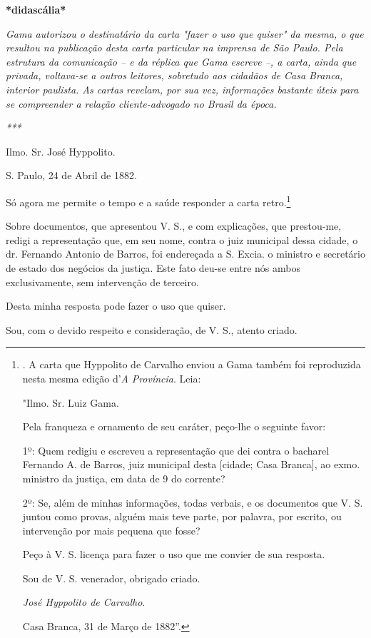 \textbf{*didascália*}

\emph{Gama autorizou o destinatário da carta "fazer o uso que quiser" da
mesma, o que resultou na publicação desta carta particular na imprensa
de São Paulo. Pela estrutura da comunicação -- e da réplica que Gama
escreve --, a carta, ainda que privada, voltava-se a outros leitores,
sobretudo aos cidadãos de Casa Branca, interior paulista. As cartas
revelam, por sua vez, informações bastante úteis para se compreender a
relação cliente-advogado no Brasil da época.}

\emph{***}

Ilmo. Sr. José Hyppolito.

S. Paulo, 24 de Abril de 1882.

Só agora me permite o tempo e a saúde responder a carta retro.\footnote{.
  A carta que Hyppolito de Carvalho enviou a Gama também foi reproduzida
  nesta mesma edição d'\emph{A} \emph{Província}. Leia:

  "Ilmo. Sr. Luiz Gama.

  Pela franqueza e ornamento de seu caráter, peço-lhe o seguinte favor:

  1º: Quem redigiu e escreveu a representação que dei contra o bacharel
  Fernando A. de Barros, juiz municipal desta {[}cidade; Casa Branca{]},
  ao exmo. ministro da justiça, em data de 9 do corrente?

  2º: Se, além de minhas informações, todas verbais, e os documentos que
  V. S. juntou como provas, alguém mais teve parte, por palavra, por
  escrito, ou intervenção por mais pequena que fosse?

  Peço à V. S. licença para fazer o uso que me convier de sua resposta.

  Sou de V. S. venerador, obrigado criado.

  \emph{José Hyppolito de Carvalho}.

  Casa Branca, 31 de Março de 1882''.}

Sobre documentos, que apresentou V. S., e com explicações, que
prestou-me, redigi a representação que, em seu nome, contra o juiz
municipal dessa cidade, o dr. Fernando Antonio de Barros, foi endereçada
a S. Excia. o ministro e secretário de estado dos negócios da justiça.
Este fato deu-se entre nós ambos exclusivamente, sem intervenção de
terceiro.

Desta minha resposta pode fazer o uso que quiser.

Sou, com o devido respeito e consideração, de V. S., atento criado.

